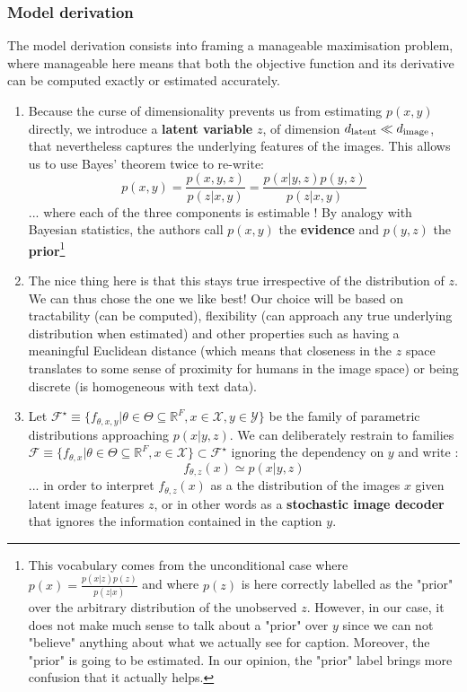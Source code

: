 \documentclass{article}
\begin{document}
\begin{appendix}
\subsubsection{Model derivation}

The model derivation consists into framing a manageable maximisation problem, where manageable here means that both the objective function and its derivative can be computed exactly or estimated accurately.

\begin{enumerate}
    \item Because the curse of dimensionality prevents us from estimating $p(x,y)$ directly, we introduce a \textbf{latent variable} $z$, of dimension ${d_{\mathrm{latent}}} \ll d_{\mathrm{image}}$, that nevertheless captures the underlying features of the images. This allows us to use Bayes' theorem twice to re-write: $$p(x,y)=\frac{p(x,y,z)}{p(z|x,y)}=\frac{p(x|y,z)p(y,z)}{p(z|x,y)}$$
    ... where each of the three components is estimable ! By analogy with Bayesian statistics, the authors call $p(x,y)$ the \textbf{evidence} and $p(y,z)$ the \textbf{prior}\footnote{This vocabulary comes from the unconditional case where $p(x)=\frac{p(x|z)p(z)}{p(z|x)}$ and where $p(z)$ is here correctly labelled as the "prior" over the arbitrary distribution of the unobserved $z$. However, in our case, it does not make much sense to talk about a "prior" over $y$ since we can not "believe" anything about what we actually see for caption. Moreover, the "prior" is going to be estimated. In our opinion, the "prior" label brings more confusion that it actually helps.}
    \item The nice thing here is that this stays true irrespective of the distribution of $z$. We can thus chose the one we like best! Our choice will be based on tractability (can be computed), flexibility (can approach any true underlying distribution when estimated) and other properties such as having a meaningful Euclidean distance (which means that closeness in the $z$ space translates to some sense of proximity for humans in the image space) or being discrete (is homogeneous with text data).
    \item Let $\mathcal{F}^\star\equiv\{f_{\theta,x,y}|\theta\in\Theta\subseteq\mathbb{R}^{F}, x\in\mathcal{X}, y\in\mathcal{Y}\}$ be the family of parametric distributions approaching $p(x|y,z)$. We can deliberately restrain to families $\mathcal{F}\equiv\{f_{\theta,x}|\theta\in\Theta\subseteq\mathbb{R}^{F}, x\in\mathcal{X}\}\subset \mathcal{F}^\star$ ignoring the dependency on $y$ and write :
    $$f_{\theta,z}(x) \simeq p(x |y,z)$$
    ... in order to interpret $f_{\theta,z}(x)$ as a the distribution of the images $x$ given latent image features $z$, or in other words as a \textbf{stochastic image decoder} that ignores the information contained in the caption $y$.
    

\end{enumerate}
\end{appendix}
\end{document}
